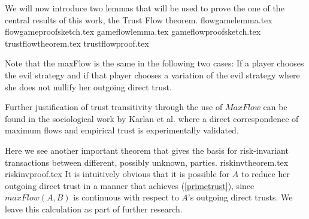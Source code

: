   We will now introduce two lemmas that will be used to prove the one of the central results of this work, the Trust Flow
  theorem.
  {flowgamelemma.tex}
  {flowgameproofsketch.tex}
  {gameflowlemma.tex}
  {gameflowproofsketch.tex}
  {trustflowtheorem.tex}
  {trustflowproof.tex}

  \noindent Note that the maxFlow is the same in the following two cases: If a player chooses the evil strategy and if that
  player chooses a variation of the evil strategy where she does not nullify her outgoing direct trust.

  Further justification of trust transitivity through the use of $MaxFlow$ can be found in the sociological work by Karlan et
  al. \cite{kmrs} where a direct correspondence of maximum flows and empirical trust is experimentally validated.

  Here we see another important theorem that gives the basis for risk-invariant transactions between different, possibly
  unknown, parties.
  {riskinvtheorem.tex}
  {riskinvproof.tex}
  \noindent It is intuitively obvious that it is possible for $A$ to reduce her outgoing direct trust in a manner that
  achieves (\ref{primetrust}), since $maxFlow\left(A, B\right)$ is continuous with respect to $A$'s outgoing direct trusts. We
  leave this calculation as part of further research.
